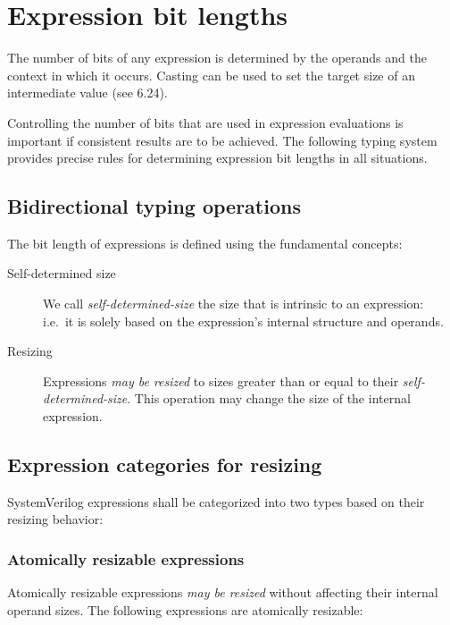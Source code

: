 \documentclass{article}
\newcommand{\sds}{\emph{self-determined-size}}
\newcommand{\mbr}{\emph{may be resized}}
\begin{document}
\section{Expression bit lengths}%
\label{expression-bit-lengths}

The number of bits of any expression is determined by the operands and the
context in which it occurs. Casting can be used to set the target size of an
intermediate value (see 6.24).

Controlling the number of bits that are used in expression evaluations is
important if consistent results are to be achieved. The following typing system
provides precise rules for determining expression bit lengths in all situations.

\subsection{Bidirectional typing operations}%

The bit length of expressions is defined using the fundamental concepts:

\begin{description}
  \item[Self-determined size]
    We call \sds{} the size that is intrinsic to an expression: i.e.~it is
    solely based on the expression's internal structure and operands.

  \item[Resizing]
    Expressions \mbr{} to sizes greater than or equal to their \sds{}. This
    operation may change the size of the internal expression.
\end{description}

\subsection{Expression categories for resizing}%

SystemVerilog expressions shall be categorized into two types based on their
resizing behavior:

\subsubsection{Atomically resizable expressions}%

Atomically resizable expressions \mbr{} without affecting their
internal operand sizes. The following expressions are atomically resizable:
\end{document}
